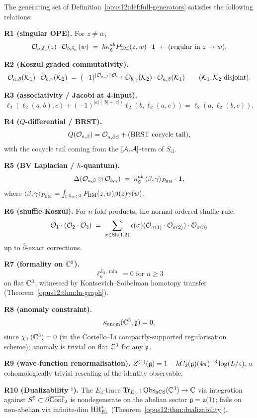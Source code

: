 \begin{theorem}\ClaimStatusTheorem
\label{opus12:thm:relations}
The generating set of Definition~\ref{opus12:def:full-generators}
satisfies the following relations:

\textbf{R1 (singular OPE).} For $z \ne w$,
\[
\mathcal{O}_{a, \delta_z}(z) \cdot \mathcal{O}_{b, \delta_w}(w) \;=\;
\hbar \kappa^{ab}_{\mathfrak{g}} P_{\mathrm{BM}}(z, w) \cdot \mathbf{1}
\;+\; (\text{regular in } z \to w).
\]

\textbf{R2 (Koszul graded commutativity).}
\[
\mathcal{O}_{a, \beta}(\mathcal K_1) \cdot \mathcal{O}_{b, \gamma}(\mathcal K_2) \;=\;
(-1)^{|\mathcal{O}_{a, \beta}||\mathcal{O}_{b, \gamma}|}
\mathcal{O}_{b, \gamma}(\mathcal K_2) \cdot \mathcal{O}_{a, \beta}(\mathcal K_1)
\qquad (\mathcal K_1, \mathcal K_2 \text{ disjoint}).
\]

\textbf{R3 (associativity / Jacobi at 4-input).}
\[
\ell_2(\ell_2(a, b), c) + (-1)^{|a|(|b| + |c|)} \ell_2(b, \ell_2(a, c)) =
\ell_2(a, \ell_2(b, c)).
\]

\textbf{R4 ($Q$-differential / BRST).}
\[
Q(\mathcal{O}_{a, \beta}) = \mathcal{O}_{a, \bar\partial\beta} + (\text{BRST cocycle tail}),
\]
with the cocycle tail coming from the $[\mathcal{A}, \mathcal{A}]$-term of
$S_{\mathrm{cl}}$.

\textbf{R5 (BV Laplacian / $\hbar$-quantum).}
\[
\Delta(\mathcal{O}_{a, \beta} \otimes \mathcal{O}_{b, \gamma}) \;=\;
\kappa^{ab}_{\mathfrak{g}} \, \langle \beta, \gamma \rangle_{P_{\mathrm{BM}}}
\cdot \mathbf{1},
\]
where
$\langle \beta, \gamma\rangle_{P_{\mathrm{BM}}} = \int_{\mathbb{C}^3 \times \mathbb{C}^3}
P_{\mathrm{BM}}(z, w) \beta(z) \gamma(w)$.

\textbf{R6 (shuffle-Koszul).} For $n$-fold products, the
normal-ordered shuffle rule:
\[
\mathcal{O}_1 \cdot (\mathcal{O}_2 \cdot \mathcal{O}_3) \;=\; \sum_{\sigma \in \mathrm{Sh}(1,2)}
\epsilon(\sigma) (\mathcal{O}_{\sigma(1)} \cdot \mathcal{O}_{\sigma(2)}) \cdot
\mathcal{O}_{\sigma(3)}
\]
up to $\bar\partial$-exact corrections.

\textbf{R7 (formality on $\mathbb{C}^3$).}
\[
\ell_n^{E_3, \min} = 0 \text{ for } n \ge 3
\]
on flat $\mathbb{C}^3$, witnessed by Kontsevich--Soibelman homotopy transfer
(Theorem~\ref{opus12:thm:ln-graph}).

\textbf{R8 (anomaly constraint).}
\[
\kappa_{\mathrm{anom}}(\mathbb{C}^3, \mathfrak{g}) = 0,
\]
since $\chi_\top(\mathbb{C}^3) = 0$ (in the Costello--Li compactly-supported
regularisation scheme); anomaly is trivial on flat $\mathbb{C}^3$ for any
$\mathfrak{g}$.

\textbf{R9 (wave-function renormalisation).} $Z^{(1)}(\mathfrak{g}) = 1 -
\hbar C_2(\mathfrak{g}) (4\pi)^{-3} \log(L/\varepsilon)$, a cohomologically
trivial rescaling of the identity observable.

\textbf{R10 (Dualizability ${}^\natural$).} The $E_3$-trace
$\mathrm{Tr}_{E_3}: \mathrm{Obs}_{\mathrm{hCS}}(\mathbb{C}^3) \to \mathbb{C}$ via integration against
$S^5 \subset \partial \overline{\mathrm{Conf}}_2$ is nondegenerate on the
abelian sector $\mathfrak{g} = \mathfrak{u}(1)$; fails on non-abelian via
infinite-dim $\mathrm{HH}^*_{E_3}$ (Theorem~\ref{opus12:thm:dualizability}).
\end{theorem}

